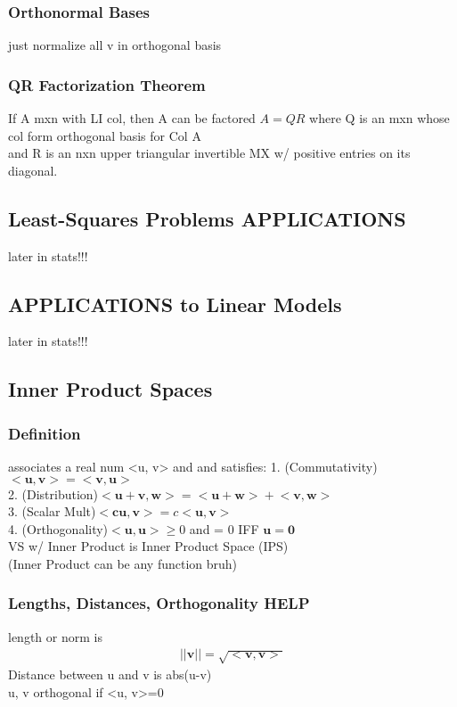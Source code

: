 \documentclass[12pt]{article}
\begin{document}
    \subsubsection{Orthonormal Bases}
        just normalize all v in orthogonal basis
    \subsubsection{QR Factorization Theorem}
        If A mxn with LI col, then A can be factored
        $A = QR$  where Q is an mxn whose col form orthogonal basis for Col A\\
        and R is an nxn upper triangular invertible MX w/ positive entries
        on its diagonal.
\subsection{Least-Squares Problems APPLICATIONS}
    later in stats!!!
\subsection{APPLICATIONS to Linear Models}
    later in stats!!!
\subsection{Inner Product Spaces}
    \subsubsection{Definition}
        associates a real num <u, v> and and satisfies:
        1. (Commutativity)$ \big<\bm{u}, \bm{v}\big> 
        = \big<\bm{v}, \bm{u}\big> $ \\
        2. (Distribution)$ \big<\bm{u}+\bm{v}, \bm{w}\big> = 
        \big<\bm{u}+\bm{w}\big> + \big<\bm{v}, \bm{w}\big>$ \\
        3. (Scalar Mult)$ \big<\bm{cu}, \bm{v}\big> = 
        c\big<\bm{u}, \bm{v}\big> $ \\
        4. (Orthogonality)$ \big<\bm{u}, \bm{u}\big> \ge 0 $
        and = 0 IFF $\bm{u}= \bm{0}$ \\
        VS w/ Inner Product is Inner Product Space (IPS)\\
        (Inner Product can be any function bruh)
    \subsubsection{Lengths, Distances, Orthogonality HELP}
        length or norm is 
        \begin{align*}
            ||\bm{v}|| = \sqrt{ \big<\bm{v}, \bm{v}\big> }
        \end{align*}
        Distance between u and v is abs(u-v) \\
        u, v orthogonal if <u, v>=0
\end{document}
